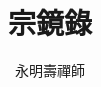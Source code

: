 \documentclass[a4paper,UTF8]{ctexbook}
\begin{document}
\title{宗鏡錄}
\author{永明壽禪師}
\date{}
\maketitle

\tableofcontents
















\printindex
\end{document}

